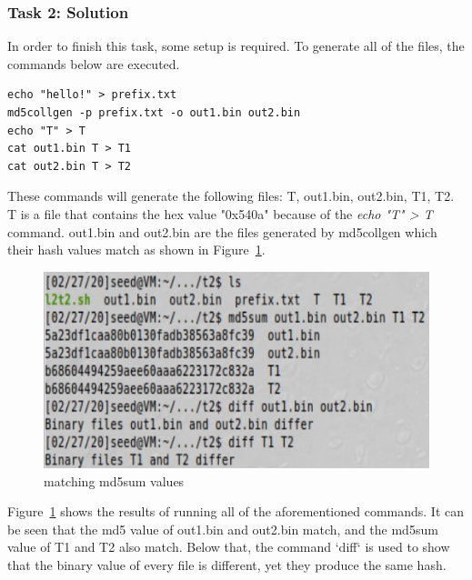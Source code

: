 \documentclass[12pt]{article}
\begin{document}
\subsubsection{Task 2: Solution}

In order to finish this task, some setup is required. To generate all of the files, the commands below are executed.
\begin{verbatim}
echo "hello!" > prefix.txt
md5collgen -p prefix.txt -o out1.bin out2.bin
echo "T" > T
cat out1.bin T > T1
cat out2.bin T > T2
\end{verbatim}

These commands will generate the following files: T, out1.bin, out2.bin, T1, T2. T is a file that contains the hex value "0x540a" because of the \emph{echo "T" > T} command. out1.bin and out2.bin are the files generated by md5collgen which their hash values match as shown in Figure~\ref{fig:t2p1}.

\begin{figure}[H]
	\begin{center}
		\includegraphics[scale=0.65]{pics/t2p1.png}
	\end{center}{}
	\caption{matching md5sum values}
	\label{fig:t2p1}
\end{figure}

Figure~\ref{fig:t2p1} shows the results of running all of the aforementioned commands. It can be seen that the md5 value of out1.bin and out2.bin match, and the md5sum value of T1 and T2 also match. Below that, the command `diff` is used to show that the binary value of every file is different, yet they produce the same hash.
\end{document}

